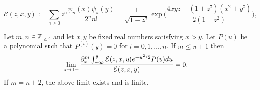 \documentclass[10pt,a4paper]{amsart}
\def\E{{\mathcal E}}
\def\d{{\textnormal d}}
\begin{document}
\begin{equation}\label{def_mathcal_E}
{\mathcal E}(z,x,y):=\sum\limits_{n\geqslant 0} z^n \frac{\psi_n(x) \psi_n(y)}{2^n n!}=
\frac{1}{\sqrt{1-z^2}} \exp\bigg( \frac{4xyz-(1+z^2)(x^2+y^2)}{2(1-z^2)} \bigg),
\end{equation}

\begin{lemma}\label{lemma6}
Let $m,n \in {\mathbb Z}_{\geqslant 0}$ and let $x, y$ be fixed real numbers satisfying $x>y$. Let $P(u)$ be a polynomial such that $P^{(i)}(y)=0$ for $i=0,1,\dots,n$. If $m\leqslant n+1$ then 
\begin{equation}\label{eqn_integral_limit}
\lim\limits_{z\to 1-} \frac{\partial_x^{m} \int_{-\infty}^y \E(z,x,u) e^{-u^2/2}  P(u) \d u}{\E(z,x,y)} 
=0. 
\end{equation}
If $m=n+2$, the above limit exists and is finite.  
\end{lemma}
\end{document}
